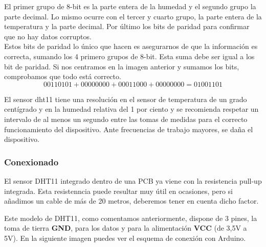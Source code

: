 El primer grupo de 8-bit es la parte entera de la humedad y el segundo grupo la parte decimal. Lo mismo ocurre con el tercer y cuarto grupo, la parte entera de la temperatura 
y la parte decimal. Por último los bits de paridad para confirmar que no hay datos corruptos.\\

Estos bits de paridad lo único que hacen es asegurarnos de que la información es correcta, sumando los 4 primero grupos de 8-bit. Esta suma debe ser igual a los bit de
paridad. Si nos centramos en la imagen anterior y sumamos los bits, comprobamos que todo está correcto.\\

\begin{equation}
0011 0101 + 0000 0000 + 0001 1000 + 0000 0000 = 0100 1101
\end{equation}

El sensor dht11 tiene una resolución en el sensor de temperatura de un grado centígrado y en la
humedad relativa del 1 por ciento y se recomienda respetar un intervalo de al menos un segundo entre las
tomas de medidas para el correcto funcionamiento del dispositivo. Ante frecuencias de trabajo
mayores, se daña el dispositivo.\\

\subsubsection{Conexionado}

El sensor DHT11 integrado dentro de una PCB ya viene con la resistencia pull-up integrada. Esta resistenncia puede resultar muy útil en ocasiones, pero si añadimos un cable
de más de 20 metros, deberemos tener en cuenta dicho factor.

Este modelo de DHT11, como comentamos anteriormente, dispone de 3 pines, la toma de tierra \textbf{GND}, para los datos  y para la alimentación \textbf{VCC} 
(de 3,5V a 5V). En la siguiente imagen puedes ver el esquema de conexión con Arduino.

